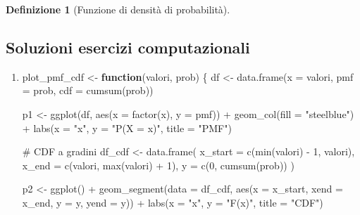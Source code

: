 \documentclass[
  italian,
  letterpaper,
  a4paper,
  11pt,
  open=any]{scrbook}
\newenvironment{Shaded}{\begin{snugshade}}{\end{snugshade}}
\newcommand{\AttributeTok}[1]{\textcolor[rgb]{0.40,0.45,0.13}{#1}}
\newcommand{\CommentTok}[1]{\textcolor[rgb]{0.37,0.37,0.37}{#1}}
\newcommand{\ControlFlowTok}[1]{\textcolor[rgb]{0.00,0.23,0.31}{\textbf{#1}}}
\newcommand{\DecValTok}[1]{\textcolor[rgb]{0.68,0.00,0.00}{#1}}
\newcommand{\FunctionTok}[1]{\textcolor[rgb]{0.28,0.35,0.67}{#1}}
\newcommand{\NormalTok}[1]{\textcolor[rgb]{0.00,0.23,0.31}{#1}}
\newcommand{\OtherTok}[1]{\textcolor[rgb]{0.00,0.23,0.31}{#1}}
\newcommand{\SpecialCharTok}[1]{\textcolor[rgb]{0.37,0.37,0.37}{#1}}
\newcommand{\StringTok}[1]{\textcolor[rgb]{0.13,0.47,0.30}{#1}}
\theoremstyle{plain}
\theoremstyle{definition}
\theoremstyle{definition}
\newtheorem{definition}{Definizione}[chapter]
\theoremstyle{remark}
\begin{document}
\begin{definition}[Funzione di densità di
probabilità]
\begin{tcolorbox}
\subsection*{Soluzioni esercizi
computazionali}\label{soluzioni-esercizi-computazionali}

\begin{enumerate}
\def\labelenumi{\arabic{enumi}.}
\setcounter{enumi}{10}
\item
\begin{Shaded}
\begin{Highlighting}[]
\NormalTok{plot\_pmf\_cdf }\OtherTok{\textless{}{-}} \ControlFlowTok{function}\NormalTok{(valori, prob) \{}
\NormalTok{  df }\OtherTok{\textless{}{-}} \FunctionTok{data.frame}\NormalTok{(}\AttributeTok{x =}\NormalTok{ valori, }\AttributeTok{pmf =}\NormalTok{ prob, }\AttributeTok{cdf =} \FunctionTok{cumsum}\NormalTok{(prob))}

\NormalTok{  p1 }\OtherTok{\textless{}{-}} \FunctionTok{ggplot}\NormalTok{(df, }\FunctionTok{aes}\NormalTok{(}\AttributeTok{x =} \FunctionTok{factor}\NormalTok{(x), }\AttributeTok{y =}\NormalTok{ pmf)) }\SpecialCharTok{+}
    \FunctionTok{geom\_col}\NormalTok{(}\AttributeTok{fill =} \StringTok{"steelblue"}\NormalTok{) }\SpecialCharTok{+}
    \FunctionTok{labs}\NormalTok{(}\AttributeTok{x =} \StringTok{"x"}\NormalTok{, }\AttributeTok{y =} \StringTok{"P(X = x)"}\NormalTok{, }\AttributeTok{title =} \StringTok{"PMF"}\NormalTok{)}

  \CommentTok{\# CDF a gradini}
\NormalTok{  df\_cdf }\OtherTok{\textless{}{-}} \FunctionTok{data.frame}\NormalTok{(}
    \AttributeTok{x\_start =} \FunctionTok{c}\NormalTok{(}\FunctionTok{min}\NormalTok{(valori) }\SpecialCharTok{{-}} \DecValTok{1}\NormalTok{, valori),}
    \AttributeTok{x\_end =} \FunctionTok{c}\NormalTok{(valori, }\FunctionTok{max}\NormalTok{(valori) }\SpecialCharTok{+} \DecValTok{1}\NormalTok{),}
    \AttributeTok{y =} \FunctionTok{c}\NormalTok{(}\DecValTok{0}\NormalTok{, }\FunctionTok{cumsum}\NormalTok{(prob))}
\NormalTok{  )}

\NormalTok{  p2 }\OtherTok{\textless{}{-}} \FunctionTok{ggplot}\NormalTok{() }\SpecialCharTok{+}
    \FunctionTok{geom\_segment}\NormalTok{(}\AttributeTok{data =}\NormalTok{ df\_cdf, }
                 \FunctionTok{aes}\NormalTok{(}\AttributeTok{x =}\NormalTok{ x\_start, }\AttributeTok{xend =}\NormalTok{ x\_end, }\AttributeTok{y =}\NormalTok{ y, }\AttributeTok{yend =}\NormalTok{ y)) }\SpecialCharTok{+}
    \FunctionTok{labs}\NormalTok{(}\AttributeTok{x =} \StringTok{"x"}\NormalTok{, }\AttributeTok{y =} \StringTok{"F(x)"}\NormalTok{, }\AttributeTok{title =} \StringTok{"CDF"}\NormalTok{)}


\end{Highlighting}
\end{Shaded}
\end{enumerate}
\end{tcolorbox}
\end{definition}
\end{document}
